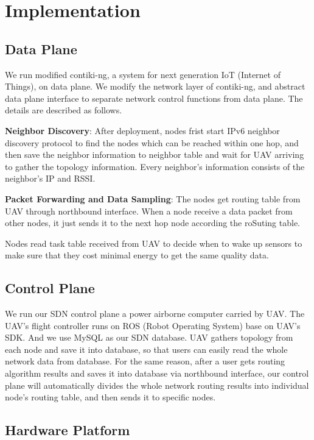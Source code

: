 \section{Implementation}
\label{Imp}



\subsection{Data Plane}

We run modified contiki-ng, a system for next generation IoT (Internet of
Things), on data plane. We modify the network layer of contiki-ng, and abstract
data plane interface to separate network control functions from data plane. 
The details are described as follows.

\textbf{Neighbor Discovery}: After deployment, nodes frist start IPv6 neighbor
discovery protocol to find the nodes which can be reached within one hop, and
then save the neighbor information to neighbor table and wait for UAV arriving
to gather the topology information. Every neighbor's information consists of the
neighbor's IP and RSSI. 

\textbf{Packet Forwarding and Data Sampling}: The nodes get routing table from UAV through
northbound interface. When a node receive a data packet from other nodes, it
just sends it to the next hop node according the roSuting table.

Nodes read task table received from UAV to decide when
to wake up sensors to make sure that they cost minimal energy to get the same
quality data. 

\subsection{Control Plane}

We run our SDN control plane a power airborne computer carried by UAV. 
The UAV's flight controller runs on ROS (Robot Operating System) base on UAV's SDK.
And we use MySQL as our SDN database. UAV gathers topology from each node and save
it into database, so that users can easily read the whole network data from
database. For the same reason, after a user gets routing algorithm results and
saves it into database via northbound interface, our control plane will
automatically divides the whole network routing results into individual node's
routing table, and then sends it to specific nodes.

\subsection{Hardware Platform}

